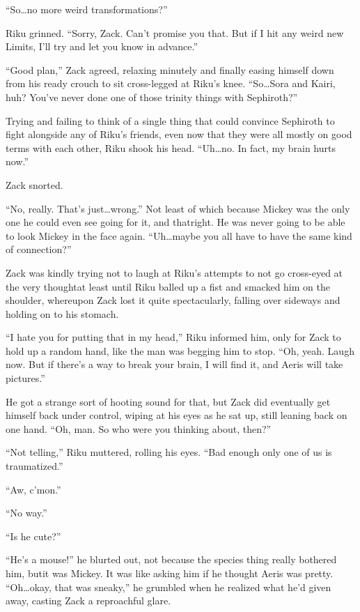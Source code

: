 ``So\ldots no more weird transformations?''

Riku grinned. ``Sorry, Zack. Can't promise you that. But if I hit any weird new Limits, I'll try and let you know in advance.''

``Good plan,'' Zack agreed, relaxing minutely and finally easing himself down from his ready crouch to sit cross-legged at Riku's knee. ``So\ldots Sora and Kairi, huh? You've never done one of those trinity things with Sephiroth?''

Trying and failing to think of a single thing that could convince Sephiroth to fight alongside any of Riku's friends, even now that they were all mostly on good terms with each other, Riku shook his head. ``Uh\ldots no. In fact, my brain hurts now.''

Zack snorted.

``No, really. That's just\ldots wrong.'' Not least of which because Mickey was the only one he could even see going for it, and that\textemdash right. He was never going to be able to look Mickey in the face again. ``Uh\ldots maybe you all have to have the same kind of connection?''

Zack was kindly trying not to laugh at Riku's attempts to not go cross-eyed at the very thought\textemdash at least until Riku balled up a fist and smacked him on the shoulder, whereupon Zack lost it quite spectacularly, falling over sideways and holding on to his stomach.

``I hate you for putting that in my head,'' Riku informed him, only for Zack to hold up a random hand, like the man was begging him to stop. ``Oh, yeah. Laugh now. But if there's a way to break your brain, I will find it, and Aeris will take pictures.''

He got a strange sort of hooting sound for that, but Zack did eventually get himself back under control, wiping at his eyes as he sat up, still leaning back on one hand. ``Oh, man. So who were you thinking about, then?''

``Not telling,'' Riku muttered, rolling his eyes. ``Bad enough only one of us is traumatized.''

``Aw, c'mon.''

``No way.''

``Is he cute?''

``He's a mouse!'' he blurted out, not because the species thing really bothered him, but\textemdash it was Mickey. It was like asking him if he thought Aeris was pretty. ``Oh\ldots okay, that was sneaky,'' he grumbled when he realized what he'd given away, casting Zack a reproachful glare.

